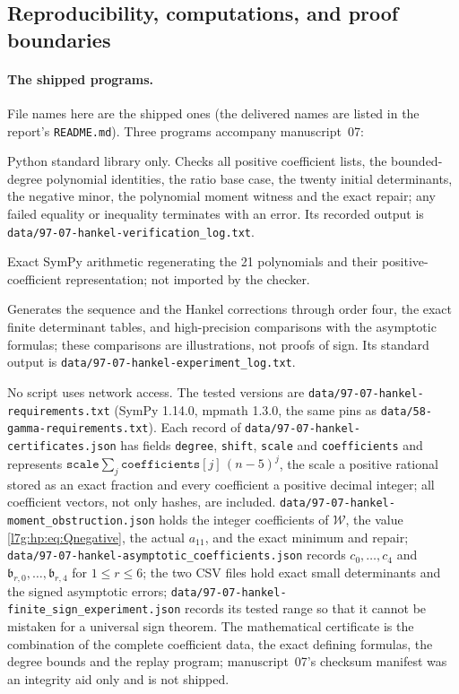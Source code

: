 \documentclass[11pt,letterpaper]{article}
\newcommand{\file}[1]{\nolinkurl{#1}}
\theoremstyle{remark}\newtheorem{remark}[theorem]{Remark}
\newcounter{l7gtrsavedeq}
\begin{document}
\subsection{Reproducibility, computations, and proof boundaries}\label{l7g:hp:sec:computations}
\paragraph{The shipped programs.}
File names here are the shipped ones (the delivered names are listed in the
report's \file{README.md}). Three programs accompany manuscript~07:
\begin{description}[leftmargin=1.5em,style=nextline]
\item[\file{code/97-07-hankel-verify_certificates.py}]
Python standard library only. Checks all positive coefficient lists, the
bounded-degree polynomial identities, the ratio base case, the twenty
initial determinants, the negative minor, the polynomial moment witness and
the exact repair; any failed equality or inequality terminates with an
error. Its recorded output is \file{data/97-07-hankel-verification_log.txt}.
\item[\file{code/97-07-hankel-generate_certificates.py}]
Exact SymPy arithmetic regenerating the 21 polynomials and their
positive-coefficient representation; not imported by the checker.
\item[\file{code/97-07-hankel-asymptotics_and_experiments.py}]
Generates the sequence and the Hankel corrections through order four, the
exact finite determinant tables, and high-precision comparisons with the
asymptotic formulas; these comparisons are illustrations, not proofs of
sign. Its standard output is \file{data/97-07-hankel-experiment_log.txt}.
\end{description}
No script uses network access. The tested versions are
\file{data/97-07-hankel-requirements.txt} (SymPy 1.14.0, mpmath 1.3.0, the
same pins as \file{data/58-gamma-requirements.txt}). Each record of
\file{data/97-07-hankel-certificates.json} has fields \texttt{degree},
\texttt{shift}, \texttt{scale} and \texttt{coefficients} and represents
$\texttt{scale}\sum_{j}\texttt{coefficients}[j]\,(n-5)^j$, the scale a
positive rational stored as an exact fraction and every coefficient a
positive decimal integer; all coefficient vectors, not only hashes, are
included. \file{data/97-07-hankel-moment_obstruction.json} holds the
integer coefficients of $\mathcal W$, the value \eqref{l7g:hp:eq:Qnegative},
the actual $a_{11}$, and the exact minimum and repair;
\file{data/97-07-hankel-asymptotic_coefficients.json} records
$c_0,\dots,c_4$ and $\mathfrak b_{r,0},\dots,\mathfrak b_{r,4}$ for
$1\le r\le6$; the two CSV files hold exact small determinants and the signed
asymptotic errors; \file{data/97-07-hankel-finite_sign_experiment.json}
records its tested range so that it cannot be mistaken for a universal sign
theorem. The mathematical certificate is the combination of the complete
coefficient data, the exact defining formulas, the degree bounds and the
replay program; manuscript~07's checksum manifest was an integrity aid
only and is not shipped.
\end{document}

